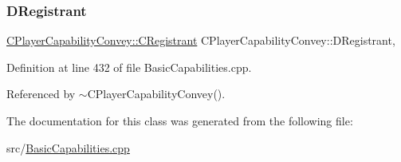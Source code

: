 \subsubsection{\texorpdfstring{D\+Registrant}{DRegistrant}}
{\footnotesize\ttfamily \hyperlink{classCPlayerCapabilityConvey_1_1CRegistrant}{C\+Player\+Capability\+Convey\+::\+C\+Registrant} C\+Player\+Capability\+Convey\+::\+D\+Registrant\hspace{0.3cm}{\ttfamily [static]}, {\ttfamily [protected]}}



Definition at line 432 of file Basic\+Capabilities.\+cpp.



Referenced by $\sim$\+C\+Player\+Capability\+Convey().



The documentation for this class was generated from the following file\+:\begin{DoxyCompactItemize}
\item 
src/\hyperlink{BasicCapabilities_8cpp}{Basic\+Capabilities.\+cpp}\end{DoxyCompactItemize}
